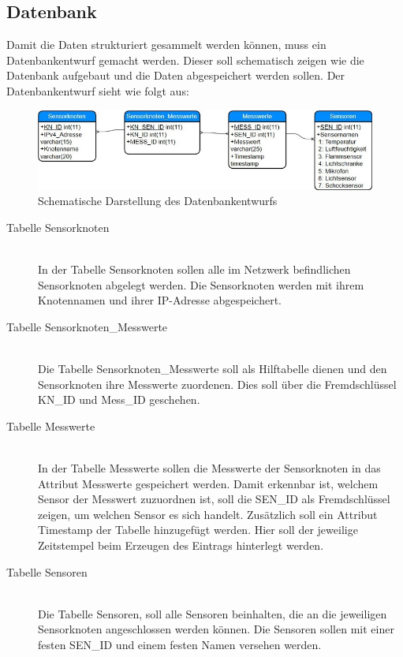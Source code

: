 \subsection{Datenbank}\label{sub:Datenbank}
Damit die Daten strukturiert gesammelt werden können, muss ein Datenbankentwurf gemacht werden. Dieser soll schematisch zeigen wie die Datenbank aufgebaut und die Daten abgespeichert werden sollen. Der Datenbankentwurf sieht wie folgt aus:
\begin{landscape}
	\begin{figure}[ht]
		\begin{center}
			\includegraphics{Bilder/Kapitel3/Datenbankentwurf1.jpg}
			\caption[Schematische Darstellung des Datenbankentwurfs]{Schematische Darstellung des Datenbankentwurfs}
			\label{fig:Datenbankentwurf}
		\end{center}
	\end{figure}
\end{landscape}
\begin{description}
	\item[Tabelle Sensorknoten] \hfill \\
		In der Tabelle Sensorknoten sollen alle im Netzwerk befindlichen Sensorknoten abgelegt werden. Die Sensorknoten werden mit ihrem Knotennamen und ihrer IP-Adresse abgespeichert.
	\item[Tabelle Sensorknoten\_Messwerte] \hfill \\
		Die Tabelle Sensorknoten\_Messwerte soll als Hilftabelle dienen und den Sensorknoten ihre Messwerte zuordenen. Dies soll über die Fremdschlüssel KN\_ID und Mess\_ID geschehen.
	\item[Tabelle Messwerte] \hfill \\
		In der Tabelle Messwerte sollen die Messwerte der Sensorknoten in das Attribut Messwerte gespeichert werden. Damit erkennbar ist, welchem Sensor der Messwert zuzuordnen ist, soll die SEN\_ID als Fremdschlüssel zeigen, um welchen Sensor es sich handelt. Zusätzlich soll ein Attribut Timestamp der Tabelle hinzugefügt werden. Hier soll der jeweilige Zeitstempel beim Erzeugen des Eintrags hinterlegt werden.
	\item[Tabelle Sensoren] \hfill \\	
		Die Tabelle Sensoren, soll alle Sensoren beinhalten, die an die jeweiligen Sensorknoten angeschlossen werden können. Die Sensoren sollen mit einer festen SEN\_ID und einem festen Namen versehen werden.
\end{description}

